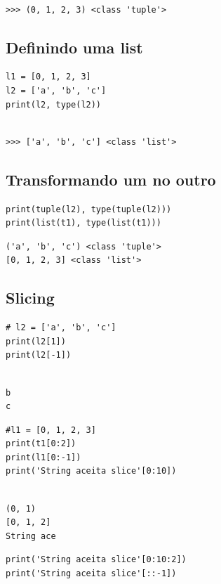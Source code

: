 \documentclass[presentation]{beamer}
\begin{document}
\begin{verbatim}

>>> (0, 1, 2, 3) <class 'tuple'>
\end{verbatim}

\subsection{Definindo uma list}
\label{sec:orgheadline47}
\begin{verbatim}
l1 = [0, 1, 2, 3]
l2 = ['a', 'b', 'c']
print(l2, type(l2))
\end{verbatim}

\begin{verbatim}

>>> ['a', 'b', 'c'] <class 'list'>
\end{verbatim}
\subsection{Transformando um no outro}
\label{sec:orgheadline48}
\begin{verbatim}
print(tuple(l2), type(tuple(l2)))
print(list(t1), type(list(t1)))
\end{verbatim}

\begin{verbatim}
('a', 'b', 'c') <class 'tuple'>
[0, 1, 2, 3] <class 'list'>
\end{verbatim}
\subsection{Slicing}
\label{sec:orgheadline49}
\begin{verbatim}
# l2 = ['a', 'b', 'c']
print(l2[1])
print(l2[-1])
\end{verbatim}

\begin{verbatim}

b
c
\end{verbatim}

\begin{verbatim}
#l1 = [0, 1, 2, 3]
print(t1[0:2])
print(l1[0:-1])
print('String aceita slice'[0:10])
\end{verbatim}

\begin{verbatim}

(0, 1)
[0, 1, 2]
String ace
\end{verbatim}

\begin{verbatim}
print('String aceita slice'[0:10:2])
print('String aceita slice'[::-1])
\end{verbatim}
\end{document}
